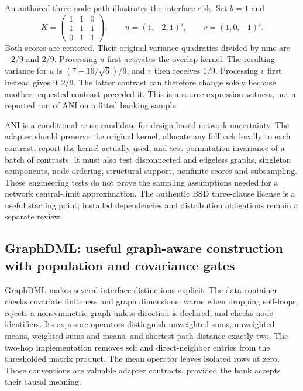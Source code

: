 An authored three-node path illustrates the interface risk. Set $b=1$ and
\[
 K=\begin{pmatrix}1&1&0\\1&1&1\\0&1&1\end{pmatrix},
 \qquad u=(1,-2,1)',\qquad v=(1,0,-1)'.
\]
Both scores are centered. Their original variance quadratics divided by nine are $-2/9$ and $2/9$. Processing $u$ first activates the overlap kernel. The resulting variance for $u$ is $(7-16/\sqrt6)/9$, and $v$ then receives $1/9$. Processing $v$ first instead gives it $2/9$. The latter contrast can therefore change solely because another requested contrast preceded it. This is a source-expression witness, not a reported run of ANI on a fitted banking sample.\citep{exec25_pnet_choice}

ANI is a conditional reuse candidate for design-based network uncertainty. The adapter should preserve the original kernel, allocate any fallback locally to each contrast, report the kernel actually used, and test permutation invariance of a batch of contrasts. It must also test disconnected and edgeless graphs, singleton components, node ordering, structural support, nonfinite scores and subsampling. These engineering tests do not prove the sampling assumptions needed for a network central-limit approximation. The authentic BSD three-clause license is a useful starting point; installed dependencies and distribution obligations remain a separate review.\citep{exec25_pnet_ani,exec25_pnet_choice}

\subsection{GraphDML: useful graph-aware construction with population and covariance gates}

GraphDML makes several interface distinctions explicit. The data container checks covariate finiteness and graph dimensions, warns when dropping self-loops, rejects a nonsymmetric graph unless direction is declared, and checks node identifiers. Its exposure operators distinguish unweighted sums, unweighted means, weighted sums and means, and shortest-path distance exactly two. The two-hop implementation removes self and direct-neighbor entries from the thresholded matrix product. The mean operator leaves isolated rows at zero. Those conventions are valuable adapter contracts, provided the bank accepts their causal meaning.\citep{exec25_pnet_dml}

